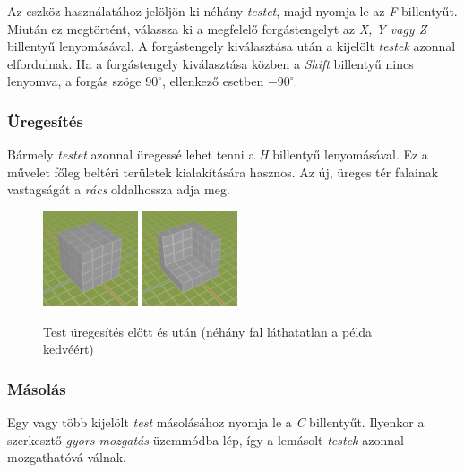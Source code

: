 Az eszköz használatához jelöljön ki néhány \emph{testet}, majd nyomja le az \emph{F} billentyűt.
Miután ez megtörtént, válassza ki a megfelelő forgástengelyt az \emph{X, Y vagy Z} billentyű
lenyomásával. A forgástengely kiválasztása után a kijelölt \emph{testek} azonnal elfordulnak.
Ha a forgástengely kiválasztása közben a \emph{Shift} billentyű nincs lenyomva, a forgás szöge
$90^{\circ}$, ellenkező esetben $-90^{\circ}$.

\subsubsection{Üregesítés}

Bármely \emph{testet} azonnal üregessé lehet tenni a \emph{H} billentyű lenyomásával. Ez a művelet
főleg beltéri területek kialakítására hasznos. Az új, üreges tér falainak vastagságát a \emph{rács}
oldalhossza adja meg.

\begin{figure}[H]
    \centering
    \includegraphics[width=0.25\textwidth]{parts/user-documentation/editor/images/hollow1.png}
    \includegraphics[width=0.25\textwidth]{parts/user-documentation/editor/images/hollow2.png}
    \caption{Test üregesítés előtt és után (néhány fal láthatatlan a példa kedvéért)}
\end{figure}

\subsubsection{Másolás}

Egy vagy több kijelölt \emph{test} másolásához nyomja le a \emph{C} billentyűt. Ilyenkor a
szerkesztő \emph{gyors mozgatás} üzemmódba lép, így a lemásolt \emph{testek} azonnal mozgathatóvá
válnak.

